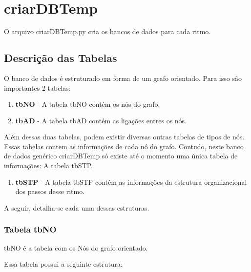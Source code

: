 
\section{criarDBTemp}

O arquivo criarDBTemp.py cria os bancos de dados para cada ritmo.

\subsection{Descrição das Tabelas}

O banco de dados é estruturado em forma de um grafo orientado. Para isso são importantes 2 tabelas: 

\begin{enumerate}
	\item \textbf{tbNO} - A tabela tbNO contém os nós do grafo. 
	\item \textbf{tbAD} - A tabela tbAD contém as ligações entres os nós.	
\end{enumerate}

Além dessas duas tabelas, podem existir diversas outras tabelas de tipos de nós. Essas tabelas contem as informações de cada nó do grafo. Contudo, neste banco de dados genérico criarDBTemp só existe até o momento uma única tabela de informações: A tabela tbSTP.

\begin{enumerate}
	\item \textbf{tbSTP} - A tabela tbSTP contém as informações da estrutura organizacional dos passos desse ritmo.
\end{enumerate}

A seguir, detalha-se cada uma dessas estruturas.


\subsubsection{Tabela tbNO}

tbNO é a tabela com os Nós do grafo orientado.

Essa tabela possui a seguinte estrutura:

